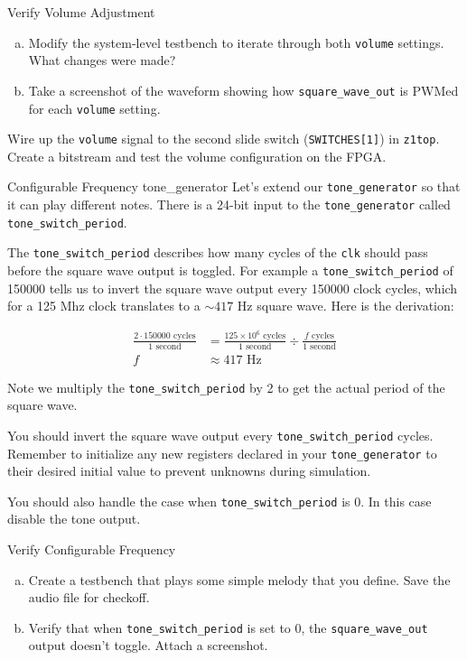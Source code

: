 \documentclass[11pt]{article}
\makeatletter
\renewcommand{\subsection}
{\@startsection {subsection}{1}{0pt}
 {-1ex}
 {0.5ex}
 {\bfseries\normalsize}}
\makeatother
\begin{document}
\begin{texexptitled}{Verify Volume Adjustment}{}
  \begin{enumerate}[a)]
    \item Modify the system-level testbench to iterate through both \verb|volume| settings. What changes were made?
    \item Take a screenshot of the waveform showing how \verb|square_wave_out| is PWMed for each \verb|volume| setting.
  \end{enumerate}
\end{texexptitled}

Wire up the \verb|volume| signal to the second slide switch (\verb|SWITCHES[1]|) in \verb|z1top|.
Create a bitstream and test the volume configuration on the FPGA.

\subsection{Configurable Frequency tone\_generator}
Let's extend our \verb|tone_generator| so that it can play different notes.
There is a 24-bit input to the \verb|tone_generator| called \verb|tone_switch_period|.

The \verb|tone_switch_period| describes how many cycles of the \verb|clk| should pass before the square wave output is toggled.
For example a \verb|tone_switch_period| of 150000 tells us to invert the square wave output every 150000 clock cycles, which for a 125 Mhz clock translates to a $\sim 417$ Hz square wave. Here is the derivation:

\begin{align*}
  \frac{2 \cdot 150000 \text{ cycles}}{1 \text{ second}} &= \frac{125 \times 10^6 \text{ cycles}}{1 \text{ second}} \div \frac{f \text{ cycles}}{1 \text{ second}} \\
  f &\approx 417 \text{ Hz}
\end{align*}

Note we multiply the \verb|tone_switch_period| by 2 to get the actual period of the square wave.

You should invert the square wave output every \verb|tone_switch_period| cycles.
Remember to initialize any new registers declared in your \verb|tone_generator| to their desired initial value to prevent unknowns during simulation.

You should also handle the case when \verb|tone_switch_period| is 0.  In this case disable the tone output.

\begin{texexptitled}{Verify Configurable Frequency}{}
  \begin{enumerate}[a)]
    \item Create a testbench that plays some simple melody that you define. Save the audio file for checkoff.
    \item Verify that when \verb|tone_switch_period| is set to 0, the \verb|square_wave_out| output doesn't toggle. Attach a screenshot.
  \end{enumerate}
\end{texexptitled}
\end{document}

